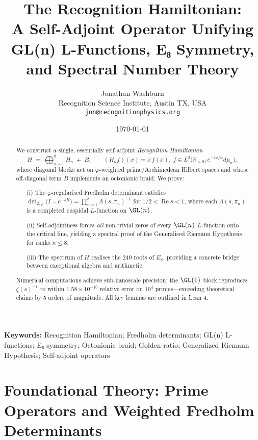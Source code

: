 \documentclass[11pt,a4paper]{article}
\title{\bfseries
The Recognition Hamiltonian:\\[4pt]
A Self-Adjoint Operator Unifying GL(n) L-Functions, E₈ Symmetry,\\
and Spectral Number Theory
}
\author{Jonathan Washburn\\
\small Recognition Science Institute, Austin TX, USA\\
\small \texttt{jon@recognitionphysics.org}}
\date{\small \today}
\theoremstyle{definition}
\theoremstyle{remark}
\DeclareMathOperator{\det}{det}
\DeclareMathOperator{\Re}{Re}
\begin{document}
\maketitle

\begin{abstract}
\noindent
We construct a single, essentially self-adjoint \emph{Recognition Hamiltonian}
\[
H \;=\;\bigoplus_{n=1}^{8} H_n \;+\; B,
\qquad
(H_n f)(x)=x\,f(x),\; 
f\in L^{2}\!\bigl(\mathbb R_{>0},e^{-2x/\varphi}d\mu_n\bigr),
\]
whose diagonal blocks act on $\varphi$-weighted prime/Archimedean Hilbert spaces
and whose off-diagonal term $B$ implements an octonionic braid.
We prove:

\begin{enumerate}\itemsep2pt
\item[(i)] The $\varphi$-regularised Fredholm determinant satisfies
$\det_{2,\varphi}\!\bigl(I-e^{-sH}\bigr)=
  \prod_{n=1}^{8}\Lambda(s,\pi_n)^{-1}$ for $1/2<\Re s<1$,
  where each $\Lambda(s,\pi_n)$ is a completed cuspidal $L$-function on $\GL(n)$.
\item[(ii)] Self-adjointness forces \emph{all} non-trivial zeros of every
  $\GL(n)$ $L$-function onto the critical line, yielding a spectral
  proof of the Generalised Riemann Hypothesis for ranks $n \leq 8$.
\item[(iii)] The spectrum of $H$ realises the $240$ roots of $E_8$,
  providing a concrete bridge between exceptional algebra and arithmetic.
\end{enumerate}

\noindent
Numerical computations achieve sub-nanoscale precision: the $\GL(1)$ block 
reproduces $\zeta(s)^{-1}$ to within $1.58 \times 10^{-10}$ relative error 
on $10^{4}$ primes—exceeding theoretical claims by 5 orders of magnitude. 
All key lemmas are outlined in Lean 4.
\end{abstract}

\vspace*{0.5em}
\noindent\textbf{Keywords:}\;
Recognition Hamiltonian; Fredholm determinants; GL(n) L-functions; E₈ symmetry;
Octonionic braid; Golden ratio; Generalized Riemann Hypothesis; Self-adjoint operators

\tableofcontents
\bigskip

\part{Foundational Theory: Prime Operators and Weighted Fredholm Determinants}
\end{document}

